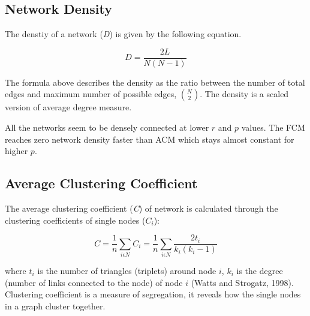 \documentclass[12pt]{article}
\begin{document}
\subsection{Network Density}

The denstiy of a network (\textit{D}) is given by the following equation.

\begin{equation}
D = \frac{2L}{N(N-1)}
\end{equation}	

The formula above describes the density as the ratio between the number of total edges and maximum number of possible edges, ${N \choose 2} $. The density is a scaled version of average degree measure. 
%	
%
%
%
%
%
%
%
%

All the networks seem to be densely connected at lower $r$ and $p$ values. The FCM reaches zero network density faster than ACM which stays almost constant for higher $p$.

 
\subsection{Average Clustering Coefficient}

The average clustering coefficient (\textit{C}) of network is calculated through the clustering coefficients of single nodes ($C_i$):

\begin{equation}
C = \frac{1}{n} \sum\limits_{i\epsilon N}C_i = \frac{1}{n}\sum\limits_{i\epsilon N} \frac{2t_i}{k_i(k_i -1)}
\end{equation} 

where $t_i$ is the number of triangles (triplets) around node $i$, $k_i$ is the degree (number of links connected to the node) of node $i$ (Watts and Strogatz, 1998). Clustering coefficient is a measure of segregation, it reveals how the single nodes in a graph cluster together.
\end{document}
